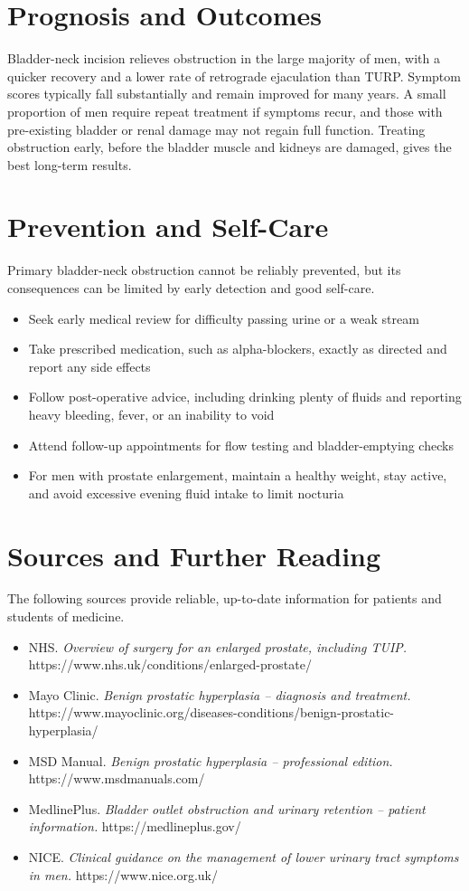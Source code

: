 \section*{Prognosis and Outcomes}
Bladder-neck incision relieves obstruction in the large majority of men, with a quicker recovery and a lower rate of retrograde ejaculation than TURP. Symptom scores typically fall substantially and remain improved for many years. A small proportion of men require repeat treatment if symptoms recur, and those with pre-existing bladder or renal damage may not regain full function. Treating obstruction early, before the bladder muscle and kidneys are damaged, gives the best long-term results.

\section*{Prevention and Self-Care}
Primary bladder-neck obstruction cannot be reliably prevented, but its consequences can be limited by early detection and good self-care.

\begin{itemize}
    \item Seek early medical review for difficulty passing urine or a weak stream
    \item Take prescribed medication, such as alpha-blockers, exactly as directed and report any side effects
    \item Follow post-operative advice, including drinking plenty of fluids and reporting heavy bleeding, fever, or an inability to void
    \item Attend follow-up appointments for flow testing and bladder-emptying checks
    \item For men with prostate enlargement, maintain a healthy weight, stay active, and avoid excessive evening fluid intake to limit nocturia
\end{itemize}

\section*{Sources and Further Reading}
The following sources provide reliable, up-to-date information for patients and students of medicine.

\begin{itemize}
    \item NHS. \textit{Overview of surgery for an enlarged prostate, including TUIP.} https://www.nhs.uk/conditions/enlarged-prostate/
    \item Mayo Clinic. \textit{Benign prostatic hyperplasia -- diagnosis and treatment.} https://www.mayoclinic.org/diseases-conditions/benign-prostatic-hyperplasia/
    \item MSD Manual. \textit{Benign prostatic hyperplasia -- professional edition.} https://www.msdmanuals.com/
    \item MedlinePlus. \textit{Bladder outlet obstruction and urinary retention -- patient information.} https://medlineplus.gov/
    \item NICE. \textit{Clinical guidance on the management of lower urinary tract symptoms in men.} https://www.nice.org.uk/
\end{itemize}
